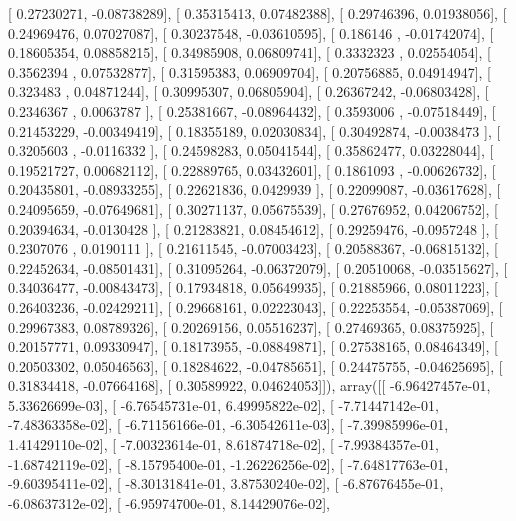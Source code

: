 \documentclass{article}
\begin{document}
       [ 0.27230271, -0.08738289],
       [ 0.35315413,  0.07482388],
       [ 0.29746396,  0.01938056],
       [ 0.24969476,  0.07027087],
       [ 0.30237548, -0.03610595],
       [ 0.186146  , -0.01742074],
       [ 0.18605354,  0.08858215],
       [ 0.34985908,  0.06809741],
       [ 0.3332323 ,  0.02554054],
       [ 0.3562394 ,  0.07532877],
       [ 0.31595383,  0.06909704],
       [ 0.20756885,  0.04914947],
       [ 0.323483  ,  0.04871244],
       [ 0.30995307,  0.06805904],
       [ 0.26367242, -0.06803428],
       [ 0.2346367 ,  0.0063787 ],
       [ 0.25381667, -0.08964432],
       [ 0.3593006 , -0.07518449],
       [ 0.21453229, -0.00349419],
       [ 0.18355189,  0.02030834],
       [ 0.30492874, -0.0038473 ],
       [ 0.3205603 , -0.0116332 ],
       [ 0.24598283,  0.05041544],
       [ 0.35862477,  0.03228044],
       [ 0.19521727,  0.00682112],
       [ 0.22889765,  0.03432601],
       [ 0.1861093 , -0.00626732],
       [ 0.20435801, -0.08933255],
       [ 0.22621836,  0.0429939 ],
       [ 0.22099087, -0.03617628],
       [ 0.24095659, -0.07649681],
       [ 0.30271137,  0.05675539],
       [ 0.27676952,  0.04206752],
       [ 0.20394634, -0.0130428 ],
       [ 0.21283821,  0.08454612],
       [ 0.29259476, -0.0957248 ],
       [ 0.2307076 ,  0.0190111 ],
       [ 0.21611545, -0.07003423],
       [ 0.20588367, -0.06815132],
       [ 0.22452634, -0.08501431],
       [ 0.31095264, -0.06372079],
       [ 0.20510068, -0.03515627],
       [ 0.34036477, -0.00843473],
       [ 0.17934818,  0.05649935],
       [ 0.21885966,  0.08011223],
       [ 0.26403236, -0.02429211],
       [ 0.29668161,  0.02223043],
       [ 0.22253554, -0.05387069],
       [ 0.29967383,  0.08789326],
       [ 0.20269156,  0.05516237],
       [ 0.27469365,  0.08375925],
       [ 0.20157771,  0.09330947],
       [ 0.18173955, -0.08849871],
       [ 0.27538165,  0.08464349],
       [ 0.20503302,  0.05046563],
       [ 0.18284622, -0.04785651],
       [ 0.24475755, -0.04625695],
       [ 0.31834418, -0.07664168],
       [ 0.30589922,  0.04624053]]), array([[ -6.96427457e-01,   5.33626699e-03],
       [ -6.76545731e-01,   6.49995822e-02],
       [ -7.71447142e-01,  -7.48363358e-02],
       [ -6.71156166e-01,  -6.30542611e-03],
       [ -7.39985996e-01,   1.41429110e-02],
       [ -7.00323614e-01,   8.61874718e-02],
       [ -7.99384357e-01,  -1.68742119e-02],
       [ -8.15795400e-01,  -1.26226256e-02],
       [ -7.64817763e-01,  -9.60395411e-02],
       [ -8.30131841e-01,   3.87530240e-02],
       [ -6.87676455e-01,  -6.08637312e-02],
       [ -6.95974700e-01,   8.14429076e-02],
\end{document}
